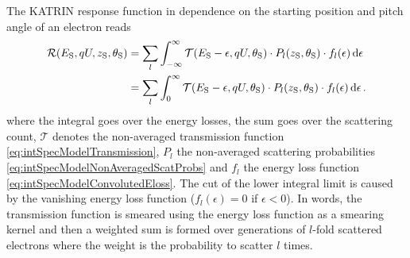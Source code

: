 The KATRIN response function in dependence on the starting position and pitch angle of an electron reads 
\begin{align}
\label{eq:intSpecModelNonAveragedResponse}
\mathcal{R}(E_\mathrm{S}, qU, z_\mathrm{S}, \theta_\mathrm{S}) &=
\sum_{l}
	\int_{-\infty}^{\infty}
		\mathcal{T}(E_\mathrm{S}-\epsilon, qU, \theta_\mathrm{S}) \cdot
		P_l(z_\mathrm{S}, \theta_\mathrm{S}) \cdot
		f_l(\epsilon)
	\mathop{}\!\mathrm{d} \epsilon \\ &=
\sum_{l}
	\int_{0}^{\infty}
		\mathcal{T}(E_\mathrm{S}-\epsilon, qU, \theta_\mathrm{S}) \cdot
		P_l(z_\mathrm{S}, \theta_\mathrm{S}) \cdot
		f_l(\epsilon)
	\mathop{}\!\mathrm{d} \epsilon
\text{\,.}
\end{align}
where the integral goes over the energy losses, the sum goes over the scattering count, $\mathcal{T}$ denotes the non-averaged transmission function \eqref{eq:intSpecModelTransmission}, $P_l$ the non-averaged scattering probabilities \eqref{eq:intSpecModelNonAveragedScatProbs} and $f_l$ the energy loss function \eqref{eq:intSpecModelConvolutedEloss}. The cut of the lower integral limit is caused by the vanishing energy loss function ($f_l(\epsilon) = 0$ if $\epsilon < 0$). In words, the transmission function is smeared using the energy loss function as a smearing kernel and then a weighted sum is formed over generations of $l$-fold scattered electrons where the weight is the probability to scatter $l$ times.

